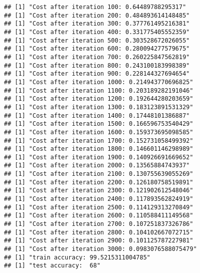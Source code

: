 \documentclass[]{article}
\begin{document}
\begin{verbatim}
## [1] "Cost after iteration 100: 0.64489788295317"
## [1] "Cost after iteration 200: 0.484893614148485"
## [1] "Cost after iteration 300: 0.377761495216381"
## [1] "Cost after iteration 400: 0.331775405552359"
## [1] "Cost after iteration 500: 0.303528672026055"
## [1] "Cost after iteration 600: 0.280094277579675"
## [1] "Cost after iteration 700: 0.260225847562819"
## [1] "Cost after iteration 800: 0.243100183998389"
## [1] "Cost after iteration 900: 0.228144327694654"
## [1] "Cost after iteration 1000: 0.214943770696825"
## [1] "Cost after iteration 1100: 0.203189282191046"
## [1] "Cost after iteration 1200: 0.192644280203659"
## [1] "Cost after iteration 1300: 0.183123891531329"
## [1] "Cost after iteration 1400: 0.17448101386887"
## [1] "Cost after iteration 1500: 0.166596753540429"
## [1] "Cost after iteration 1600: 0.159373695098585"
## [1] "Cost after iteration 1700: 0.152731058499392"
## [1] "Cost after iteration 1800: 0.146601146298989"
## [1] "Cost after iteration 1900: 0.140926691669652"
## [1] "Cost after iteration 2000: 0.13565884743937"
## [1] "Cost after iteration 2100: 0.130755639055269"
## [1] "Cost after iteration 2200: 0.126180758519891"
## [1] "Cost after iteration 2300: 0.121902612548046"
## [1] "Cost after iteration 2400: 0.117893562824919"
## [1] "Cost after iteration 2500: 0.114129313270849"
## [1] "Cost after iteration 2600: 0.110588411149568"
## [1] "Cost after iteration 2700: 0.107251837326786"
## [1] "Cost after iteration 2800: 0.104102667072715"
## [1] "Cost after iteration 2900: 0.101125787227981"
## [1] "Cost after iteration 3000: 0.0983076588075479"
## [1] "train accuracy: 99.5215311004785"
## [1] "test accuracy:  68"
\end{verbatim}
\end{document}

